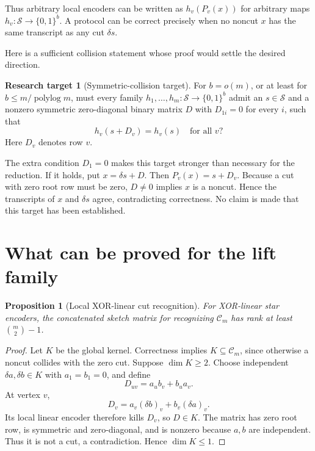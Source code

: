 \documentclass[11pt]{article}
\newtheorem{proposition}[theorem]{Proposition}
\theoremstyle{definition}\newtheorem{definition}[theorem]{Definition}
\newtheorem{question}[theorem]{Research target}
\theoremstyle{remark}\newtheorem{remark}[theorem]{Remark}
\newcommand{\cut}{\mathcal C}
\begin{document}
Thus arbitrary local encoders can be written as $h_v(P_v(x))$ for arbitrary maps $h_v:\mathcal S\to\{0,1\}^b$. A protocol can be correct precisely when no noncut $x$ has the same transcript as any cut $\delta s$.

Here is a sufficient collision statement whose proof would settle the desired direction.
\begin{question}[Symmetric-collision target]\label{q:main}
For $b=o(m)$, or at least for $b\le m/\operatorname{polylog}m$, must every family $h_1,\ldots,h_m:\mathcal S\to\{0,1\}^b$ admit an $s\in\mathcal S$ and a nonzero symmetric zero-diagonal binary matrix $D$ with $D_{1i}=0$ for every $i$, such that
\[
 \boxed{h_v(s+D_v)=h_v(s)\quad\text{for all }v?}
\]
Here $D_v$ denotes row $v$.
\end{question}
The extra condition $D_1=0$ makes this target stronger than necessary for the reduction. If it holds, put $x=\delta s+D$. Then $P_v(x)=s+D_v$. Because a cut with zero root row must be zero, $D\ne0$ implies $x$ is a noncut. Hence the transcripts of $x$ and $\delta s$ agree, contradicting correctness. No claim is made that this target has been established.

\section{What can be proved for the lift family}
\begin{proposition}[Local XOR-linear cut recognition]
For XOR-linear star encoders, the concatenated sketch matrix for recognizing $\cut_m$ has rank at least $\binom m2-1$.
\end{proposition}
\begin{proof}
Let $K$ be the global kernel. Correctness implies $K\subseteq\cut_m$, since otherwise a noncut collides with the zero cut. Suppose $\dim K\ge2$. Choose independent $\delta a,\delta b\in K$ with $a_1=b_1=0$, and define
\[
 D_{uv}=a_ub_v+b_ua_v.
\]
At vertex $v$,
\[
 D_v=a_v(\delta b)_v+b_v(\delta a)_v.
\]
Its local linear encoder therefore kills $D_v$, so $D\in K$. The matrix has zero root row, is symmetric and zero-diagonal, and is nonzero because $a,b$ are independent. Thus it is not a cut, a contradiction. Hence $\dim K\le1$.
\end{proof}
\end{document}
